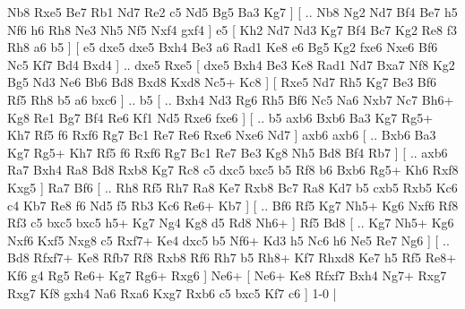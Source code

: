 Nb8  Rxe5 Be7  Rb1 Nd7  Re2 c5  Nd5 Bg5  Ba3 Kg7   ]  [ .. Nb8  Ng2 Nd7  Bf4 Be7  h5 Nf6  h6 Rh8  Ne3 Nh5  Nf5 Nxf4  gxf4   ]  e5 [  Kh2 Nd7  Nd3 Kg7  Bf4 Bc7  Kg2 Re8  f3 Rh8  a6 b5   ]  [  e5 dxe5  dxe5 Bxh4  Be3 a6  Rad1 Ke8  e6 Bg5  Kg2 fxe6  Nxe6 Bf6  Nc5 Kf7  Bd4 Bxd4   ] .. dxe5    Rxe5 [  dxe5 Bxh4  Be3 Ke8  Rad1 Nd7  Bxa7 Nf8  Kg2 Bg5  Nd3 Ne6  Bb6 Bd8  Bxd8 Kxd8  Nc5+ Kc8   ]  [  Rxe5 Nd7  Rh5 Kg7  Be3 Bf6  Rf5 Rh8  b5 a6  bxc6   ] .. b5 [ .. Bxh4  Nd3 Rg6  Rh5 Bf6  Nc5 Na6  Nxb7 Nc7  Bh6+ Kg8  Re1 Bg7  Bf4 Re6  Kf1 Nd5  Rxe6 fxe6   ]  [ .. b5  axb6 Bxb6  Ba3 Kg7  Rg5+ Kh7  Rf5 f6  Rxf6 Rg7  Bc1 Re7  Re6 Rxe6  Nxe6 Nd7   ]  axb6   axb6 [ .. Bxb6  Ba3 Kg7  Rg5+ Kh7  Rf5 f6  Rxf6 Rg7  Bc1 Re7  Be3 Kg8  Nh5 Bd8  Bf4 Rb7   ]  [ .. axb6  Ra7 Bxh4  Ra8 Bd8  Rxb8 Kg7  Rc8 c5  dxc5 bxc5  b5 Rf8  b6 Bxb6  Rg5+ Kh6  Rxf8 Kxg5   ]  Ra7   Bf6 [ .. Rh8  Rf5 Rh7  Ra8 Ke7  Rxb8 Bc7  Ra8 Kd7  b5 cxb5  Rxb5 Kc6  c4 Kb7  Re8 f6  Nd5 f5  Rb3 Kc6  Re6+ Kb7   ]  [ .. Bf6  Rf5 Kg7  Nh5+ Kg6  Nxf6 Rf8  Rf3 c5  bxc5 bxc5  h5+ Kg7  Ng4 Kg8  d5 Rd8  Nh6+   ]  Rf5   Bd8 [ .. Kg7  Nh5+ Kg6  Nxf6 Kxf5  Nxg8 c5  Rxf7+ Ke4  dxc5 b5  Nf6+ Kd3  h5 Nc6  h6 Ne5  Re7 Ng6   ]  [ .. Bd8  Rfxf7+ Ke8  Rfb7 Rf8  Rxb8 Rf6  Rh7 b5  Rh8+ Kf7  Rhxd8 Ke7  h5 Rf5  Re8+ Kf6  g4 Rg5  Re6+ Kg7  Rg6+ Rxg6   ]  Ne6+    [  Ne6+ Ke8  Rfxf7 Bxh4  Ng7+ Rxg7  Rxg7 Kf8  gxh4 Na6  Rxa6 Kxg7  Rxb6 c5  bxc5 Kf7  c6   ] 1-0  |
